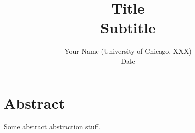 \documentclass[12pt]{article}
\author{Your Name (University of Chicago, XXX)\\
Date
}
\title{Title \\
\large \textbf{Subtitle}
}
\begin{document}
\maketitle

\section*{Abstract}
\noindent \indent Some abstract abstraction stuff.






















 
\end{document}
